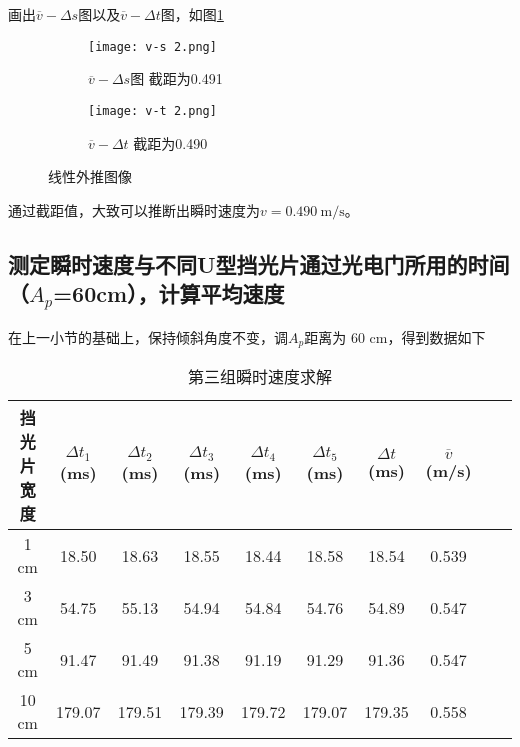 \documentclass[11pt]{article}
\begin{document}
	画出$\overline{v}-\Delta s$图以及$\overline{v}-\Delta t$图，如图\ref{fig:v2}
	\begin{figure}[H]
		\centering
		\begin{subfigure}[t]{0.45\textwidth}  %
			\centering
			\texttt{[image: v-s 2.png]}  %
			\caption{$\overline{v}-\Delta s$图 \quad 截距为0.491}
		\end{subfigure}
		\begin{subfigure}[t]{0.45\textwidth}  %
			\centering
			\texttt{[image: v-t 2.png]}  %
			\caption{$\overline{v}-\Delta t$ \quad 截距为0.490}
		\end{subfigure}
		\caption{线性外推图像}
		\label{fig:v2}
	\end{figure}
	
	通过截距值，大致可以推断出瞬时速度为$v=0.490 \ \mathrm{m/s}$。
	
	\subsection{测定瞬时速度与不同U型挡光片通过光电门所用的时间（$A_p$=60cm），计算平均速度}
	在上一小节的基础上，保持倾斜角度不变，调$A_p$距离为 60 cm，得到数据如下
	\begin{table}[H]\centering
		\caption{第三组瞬时速度求解}

	\begin{tabular}{cccccccccc}\toprule
		挡光片宽度 & $\Delta t_1$ (ms) & $\Delta t_2$ (ms) & $\Delta t_3$ (ms) & $\Delta t_4$ (ms) & $\Delta t_5$ (ms) & $\Delta t$ (ms) & $\overline{v}$ (m/s)  \\
		\midrule
		1 cm   &18.50       &18.63  &18.55  &18.44  &18.58  &18.54  &0.539 \\        
		3  cm  &54.75       &55.13  &54.94  &54.84  &54.76  &54.89  &0.547 \\        
		5  cm  &91.47       &91.49  &91.38  &91.19  &91.29  &91.36  &0.547 \\        
		10  cm &179.07 &179.51      &179.39 &179.72 &179.07 &179.35 &0.558 \\        
		\bottomrule
	\end{tabular}
	\end{table}
	
\end{document}
